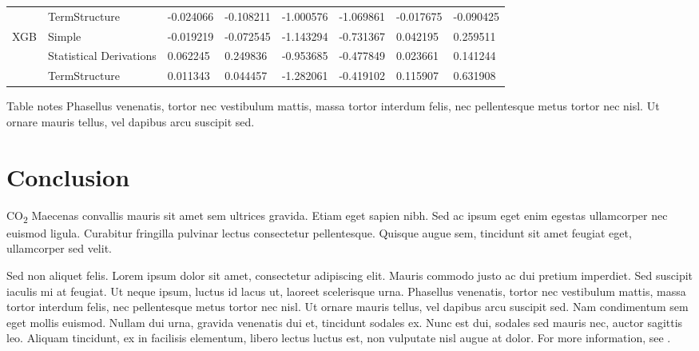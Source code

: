 \documentclass[10pt,letterpaper]{article}
\begin{document}
\begin{table}[!ht]
\begin{adjustwidth}{-2.25in}{0in}
\begin{tabular}{llp{2cm}p{2cm}p{2cm}p{2cm}p{2cm}p{2cm}}
    & TermStructure &                -0.024066 &                -0.108211 &           -1.000576 &                -1.069861 &                     -0.017675 &                     -0.090425 \\
XGB & Simple &                -0.019219 &                -0.072545 &           -1.143294 &                -0.731367 &                      0.042195 &                      0.259511 \\
    & Statistical Derivations &                 0.062245 &                 0.249836 &           -0.953685 &                -0.477849 &                      0.023661 &                      0.141244 \\
    & TermStructure &                 0.011343 &                 0.044457 &           -1.282061 &                -0.419102 &                      0.115907 &                      0.631908 \\
\bottomrule
\end{tabular}




\begin{flushleft} Table notes Phasellus venenatis, tortor nec vestibulum mattis, massa tortor interdum felis, nec pellentesque metus tortor nec nisl. Ut ornare mauris tellus, vel dapibus arcu suscipit sed.
\end{flushleft}
\label{table1}
\end{adjustwidth}

\end{table}


\section*{Conclusion}

CO\textsubscript{2} Maecenas convallis mauris sit amet sem ultrices gravida. Etiam eget sapien nibh. Sed ac ipsum eget enim egestas ullamcorper nec euismod ligula. Curabitur fringilla pulvinar lectus consectetur pellentesque. Quisque augue sem, tincidunt sit amet feugiat eget, ullamcorper sed velit. 

Sed non aliquet felis. Lorem ipsum dolor sit amet, consectetur adipiscing elit. Mauris commodo justo ac dui pretium imperdiet. Sed suscipit iaculis mi at feugiat. Ut neque ipsum, luctus id lacus ut, laoreet scelerisque urna. Phasellus venenatis, tortor nec vestibulum mattis, massa tortor interdum felis, nec pellentesque metus tortor nec nisl. Ut ornare mauris tellus, vel dapibus arcu suscipit sed. Nam condimentum sem eget mollis euismod. Nullam dui urna, gravida venenatis dui et, tincidunt sodales ex. Nunc est dui, sodales sed mauris nec, auctor sagittis leo. Aliquam tincidunt, ex in facilisis elementum, libero lectus luctus est, non vulputate nisl augue at dolor. For more information, see .
\end{document}
